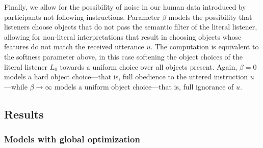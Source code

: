 \documentclass[11pt,a4paper]{article}
\begin{document}


Finally, we allow for the possibility of noise in our human data introduced by participants not following instructions.
Parameter $\beta$ models the possibility that listeners choose objects that do not pass the semantic filter of the literal listener, allowing for non-literal interpretations that result in choosing objects whose features do not match the received utterance $u$. 
The computation is equivalent to the softness parameter above, in this case softening the object choices of the literal listener $L_0$ towards a uniform choice over all objects present. 
Again, $\beta=0$ models a hard object choice---that is, full obedience to the uttered instruction $u$---while $\beta \rightarrow \infty$ models a uniform object choice---that is, full ignorance of $u$.

\subsection{Results}
\subsubsection{Models with global optimization}
\end{document}
